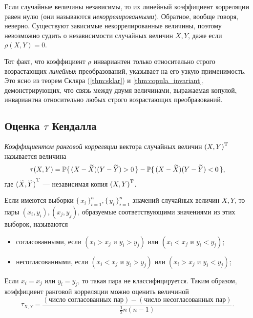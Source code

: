 Если случайные величины независимы, то их линейный коэффициент корреляции равен нулю (они называются \emph{некоррелированными}). Обратное, вообще говоря, неверно. Существуют зависимые некоррелированные величины, поэтому невозможно судить о независимости случайных величин $X, Y$, даже если $\rho(X, Y) = 0$.

Тот факт, что коэффициент $\rho$ инвариантен только относительно строго возрастающих \emph{линейных} преобразований, указывает на его узкую применимость. Это ясно из теорем Скляра (\ref{thm:sklar}) и \ref{thm:copula_invariant}, демонстрирующих, что связь между двумя величинами, выражаемая копулой, инвариантна относительно любых строго возрастающих преобразований.

\subsection*{Оценка $\tau$ Кендалла}

\begin{define}
\emph{Коэффициентом ранговой корреляции} вектора случайных величин $\trans{(X, Y)}$ называется величина
\begin{equation}\label{eq:tau}
	\tau(X, Y) = \P\{\, (X - \widetilde{X})(Y - \widetilde{Y}) > 0 \,\} - \P\{\, (X - \widetilde{X})(Y - \widetilde{Y}) < 0 \,\},
\end{equation}
где $\trans{(\widetilde{X}, \widetilde{Y})}$ --- независимая копия $\trans{(X, Y)}$.
\end{define}

Если имеются выборки $\{\, x_i \,\}_{i=1}^n, \{\, y_i \,\}_{i=1}^n$ значений случайных величин $X, Y$, то пары $(x_i, y_i), (x_j, y_j)$, образуемые соответствующими значениями из этих выборок, называются
\begin{itemize}
	\item согласованными, если $(x_i > x_j \text{ и } y_i > y_j) \text{ или } (x_i < x_j \text{ и } y_i < y_j)$;
	\item несогласованными, если $(x_i < x_j \text{ и } y_i > y_j) \text{ или } (x_i > x_j \text{ и } y_i < y_j)$;
\end{itemize}
Если $x_i = x_j \text{ или } y_i = y_j$, то такая пара не классифицируется. Таким образом, коэффициент ранговой корреляции можно оценить величиной
\begin{equation}
\tau_{X, Y} = \frac{(\text{число согласованных пар}) - (\text{число несогласованных пар})}{\frac{1}{2}n(n - 1)}.
\end{equation}

